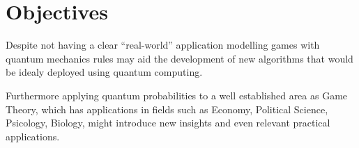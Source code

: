 \section{Objectives}
\label{sec:int_objectives}

Despite not having a clear ``real-world'' application modelling games with quantum mechanics rules may aid the development of new algorithms that would be idealy deployed using quantum computing. 

Furthermore applying quantum probabilities to a well established area as Game Theory, which has applications in fields such as Economy, Political Science, Psicology, Biology, might introduce new insights and even relevant practical applications\cite{Eisert2008}. 